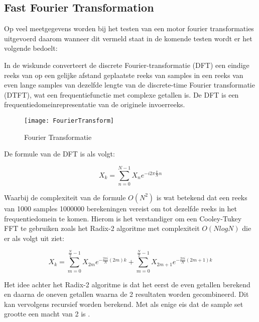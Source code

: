 \newpage

\subsection{Fast Fourier Transformation}

Op veel meetgegevens worden bij het testen van een motor fourier transformaties uitgevoerd daarom wanneer dit vermeld staat in de komende testen wordt er het volgende bedoelt:

\vspace{0.5cm}

In de wiskunde converteert de discrete Fourier-transformatie (\gls{DFT}) een eindige reeks van op een gelijke afstand geplaatste reeks van samples in een reeks van even lange samples van dezelfde lengte van de discrete-time Fourier transformatie (\gls{DTFT}), wat een frequentiefunctie met complexe getallen is. De \gls{DFT} is een frequentiedomeinrepresentatie van de originele invoerreeks.


\begin{figure}[H]
	\centering
	\texttt{[image: FourierTransform]}
	\label{fig:FourierTransformatie}
	\caption{Fourier Transformatie \cite{web:FFT}}
\end{figure}

De formule van de \gls{DFT} is als volgt:

\begin{equation}
	X_k = \sum_{n=0}^{N-1}X_n e^{-i2\pi\frac{k}{N}n}
\end{equation}

Waarbij de complexiteit van de formule $O\left(N^2\right)$ is wat betekend dat een reeks van 1000 samples 1000000 berekeningen vereist om tot dezelfde reeks in het frequentiedomein te komen. Hierom is het verstandiger om een Cooley-Tukey FFT te gebruiken zoals het Radix-2 algoritme met complexiteit $O\left(Nlog{N}\right)$ die er als volgt uit ziet:

\begin{equation}
	X_k = {\sum_{m=0}^{\frac{N}{2}-1}X_{2m}e^{-\frac{2\pi i}{N}(2m)k}} + {\sum_{m=0}^{\frac{N}{2}-1}X_{2m+1}e^{-\frac{2\pi i}{N}(2m+1)k}}
\end{equation}

Het idee achter het Radix-2 algoritme is dat het eerst de even getallen berekend en daarna de oneven getallen waarna de 2 resultaten worden gecombineerd. Dit kan vervolgens recursief worden berekend. Met als enige eis dat de sample set grootte een macht van 2 is \cite{web:Radix-2FFT}.

